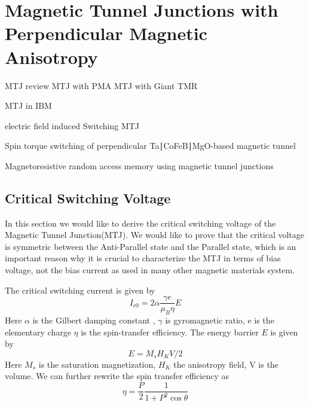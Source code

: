 \section{Magnetic Tunnel Junctions with Perpendicular Magnetic Anisotropy}

MTJ review \cite{MTJZhu}  MTJ  with PMA\cite{MTJPMA} MTJ with Giant TMR \cite{GiantTMR}

MTJ in IBM \cite{MTJIBM} \cite{MTJIBM2}

electric field induced Switching MTJ\cite{EswitchMTJ}


Spin torque switching of perpendicular Ta∣CoFeB∣MgO-based magnetic tunnel\cite{STTMTJswitch}
 

Magnetoresistive random access memory using magnetic tunnel junctions\cite{MRAMMTJs}


\subsection{Critical Switching Voltage}

In this section we would like to derive the critical switching voltage of the Magnetic Tunnel Junction(MTJ). We would like to prove that the critical voltage is symmetric between the Anti-Parallel state and the Parallel state, which is an important reason why it is crucial to characterize the MTJ in terms of bias voltage, not the bias current as used in many other magnetic materials system.

The critical switching current is given by\cite{SlonSwitching}
\begin{equation}
    I_{c0} = 2 \alpha \frac{\gamma e}{\mu_B \eta}E
\end{equation}
Here $\alpha$ is the Gilbert damping constant , $\gamma$ is gyromagnetic ratio, e is the elementary charge  $\eta$ is the spin-transfer efficiency. The energy barrier $E$ is given by
\begin{equation}
    E = M_s H_K V / 2
\end{equation}
Here $M_s$ is the saturation magnetization, $H_K$ the anisotropy field, V is the volume. We can further rewrite the spin transfer efficiency as
\begin{equation}
    \eta = \frac{P}{2}\frac{1}{1+P^2 \cos{\theta}}
\end{equation}

